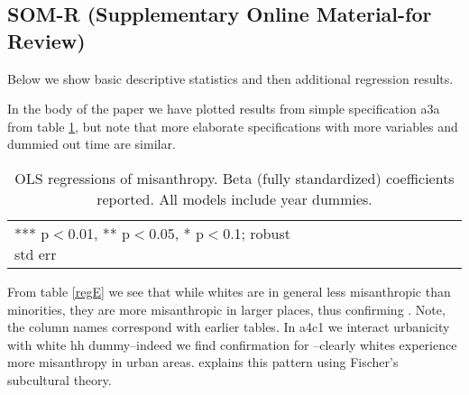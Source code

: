 \documentclass[10pt, letterpaper]{article}
\begin{document}
\begin{spacing}{1.4}



\section{\LARGE SOM-R (Supplementary Online Material-for Review)}

Below we show basic descriptive statistics and then  additional regression results.



 
 
 
 

In the body of the paper we have plotted  results from simple specification a3a
from table \ref{regDbyHand}, but note that more elaborate specifications with
more variables and dummied out time are similar.

 \begin{spacing}{.8}
\begin{table}[H]\centering
\caption{OLS regressions  of misanthropy. Beta (fully standardized) coefficients
  reported. All models include year dummies.} \label{regDbyHand}
\begin{scriptsize} \begin{tabular}{p{1.2in}p{.45in}p{.45in}p{.45in}p{.45in}p{.45in}p{.45in}p{.45in}p{.45in}p{.45in}p{.45 in}}\hline
 \hline  *** p$<$0.01, ** p$<$0.05, * p$<$0.1; robust std err
\end{tabular}\end{scriptsize}\end{table}
 \end{spacing}


From table \ref{regE} we see that while whites are in general less misanthropic
than minorities, they are more misanthropic in larger places, thus confirming
\citet{wilson85}. Note, the column names correspond with earlier tables.  
 In a4c1 we interact urbanicity with white hh
 dummy--indeed we find confirmation for \citet{wilson85}--clearly whites
 experience more misanthropy in urban areas. \citet{wilson85} explains this
 pattern 
 using Fischer's subcultural theory.


\end{spacing}
\end{document}
